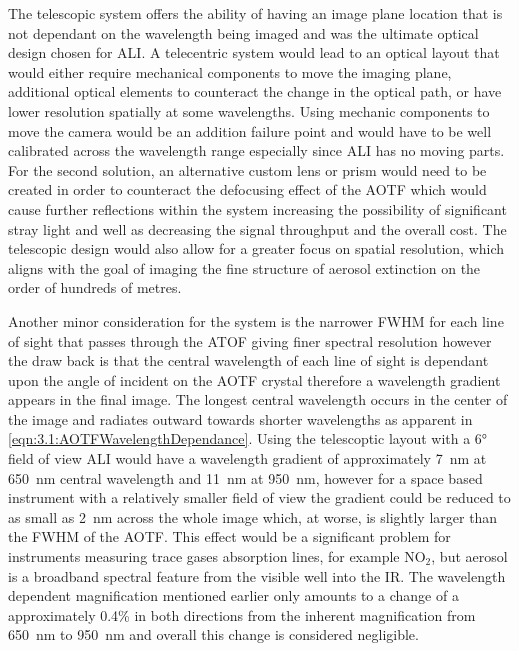 \documentclass[12pt]{article}
\begin{document}
The telescopic system offers the ability of having an image plane location that is not dependant on the wavelength being imaged and was the ultimate optical design chosen for ALI. A telecentric system would lead to an optical layout that would either require mechanical components to move the imaging plane, additional optical elements to counteract the change in the optical path, or have lower resolution spatially at some wavelengths. Using mechanic components to move the camera would be an addition failure point and would have to be well calibrated across the wavelength range especially since ALI has no moving parts. For the second solution, an alternative custom lens or prism would need to be created in order to counteract the defocusing effect of the AOTF which would cause further reflections within the system increasing the possibility of significant stray light and well as decreasing the signal throughput and the overall cost. The telescopic design would also allow for a greater focus on spatial resolution, which aligns with the goal of imaging the fine structure of aerosol extinction on the order of hundreds of metres.

Another minor consideration for the system is the narrower FWHM for each line of sight that passes through the ATOF giving finer spectral resolution however the draw back is that the central wavelength of each line of sight is dependant upon the angle of incident on the AOTF crystal therefore a wavelength gradient appears in the final image. The longest central wavelength occurs in the center of the image and radiates outward towards shorter wavelengths as apparent in \autoref{eqn:3.1:AOTFWavelengthDependance}. Using the telescoptic layout with a 6\si{\degree} field of view ALI would have a wavelength gradient of approximately 7~nm at 650~nm central wavelength and 11~nm at 950~nm, however for a space based instrument with a relatively smaller field of view the gradient could be reduced to as small as 2~nm across the whole image which, at worse, is slightly larger than the FWHM of the AOTF. This effect would be a significant problem for instruments measuring trace gases absorption lines, for example NO$_{2}$, but aerosol is a broadband spectral feature from the visible well into the IR. The wavelength dependent magnification mentioned earlier only amounts to a change of a approximately 0.4\% in both directions from the inherent magnification from 650~nm to 950~nm and overall this change is considered negligible.
\end{document}
